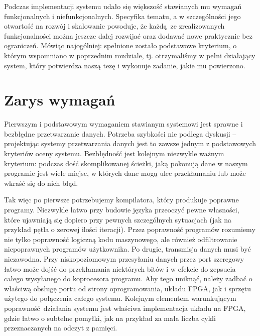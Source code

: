 Podczas implementacji systemu udało się większość stawianych mu wymagań funkcjonalnych i niefunkcjonalnych. Specyfika tematu, a w szczególności jego otwartość na rozwój i skalowanie powoduje, że każdą ze zrealizowanych funkcjonalności można jeszcze dalej rozwijać oraz dodawać nowe praktycznie bez ograniczeń. Mówiąc najogólniej: spełnione zostało podstawowe kryterium, o którym wspomniano w poprzednim rozdziale, tj. otrzymaliśmy w pełni działający system, który potwierdza naszą tezę i wykonuje zadanie, jakie mu powierzono.

\section{Zarys wymagań}
Pierwszym i podstawowym wymaganiem stawianym systemowi jest sprawne i bezbłędne przetwarzanie danych. Potrzeba szybkości nie podlega dyskusji -- projektując systemy przetwarzania danych jest to zawsze jednym z podstawowych kryteriów oceny systemu. Bezbłędność jest kolejnym niezwykle ważnym kryterium: podczas dość skomplikowanej ścieżki, jaką pokonują dane w naszym programie jest wiele miejsc, w których dane mogą ulec przekłamaniu lub może wkraść się do nich błąd.

Tak więc po pierwsze potrzebujemy kompilatora, który produkuje poprawne programy. Niezwykle łatwo przy budowie języka przeoczyć pewne własności, które ujawniają się dopiero przy pewnych szczególnych sytuacjach (jak na przykład pętla o zerowej ilości iteracji). Przez poprawność programów rozumiemy nie tylko poprawność logiczną kodu maszynowego, ale również odfiltrowanie niepoprawnych programów użytkownika. Po drugie, transmisja danych musi być niezawodna. Przy niskopoziomowym przesyłaniu danych przez port szeregowy łatwo może dojść do przekłamania niektórych bitów i w efekcie do zepsucia całego wysyłanego do koprocesora programu. Aby tego uniknąć, należy zadbać o właściwą obsługę portu od strony oprogramowania, układu FPGA, jak i sprzętu użytego do połączenia całego systemu. Kolejnym elementem warunkującym poprawność działania systemu jest właściwa implementacja układu na FPGA, gdzie łatwo o subtelne pomyłki, jak na przykład za mała liczba cykli przeznaczanych na odczyt z pamięci.

